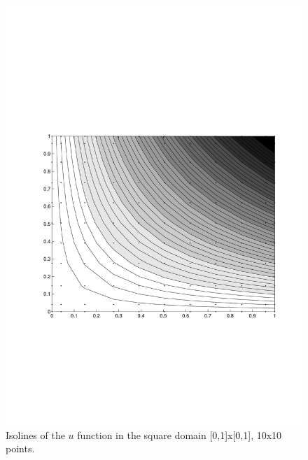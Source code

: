 \begin{multicols}{2}

\begin{figure}[H]
\centering
\includegraphics[scale=0.45, trim = 30mm 75mm 15mm 80mm, clip]{./Figures/3-BVP/results_10.pdf}
\caption{Isolines of the $u$ function in the square domain [0,1]x[0,1], 10x10
points.
}
\end{figure}


\columnbreak


\end{multicols}
